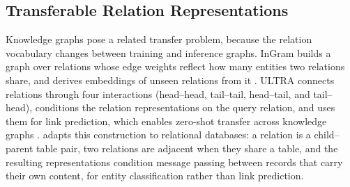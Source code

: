 \subsection{Transferable Relation Representations}
Knowledge graphs pose a related transfer problem, because the relation
vocabulary changes between training and inference graphs. InGram builds a
graph over relations whose edge weights reflect how many entities two
relations share, and derives embeddings of unseen relations from it
\citep{lee2023ingram}. ULTRA connects relations through four interactions
(head--head, tail--tail, head--tail, and tail--head), conditions the relation
representations on the query relation, and uses them for link prediction,
which enables zero-shot transfer across knowledge graphs
\citep{galkin2024ultra}. \model{} adapts this construction to relational
databases: a relation is a child--parent table pair, two relations are
adjacent when they share a table, and the resulting representations
condition message passing between records that carry their own content, for
entity classification rather than link prediction.

